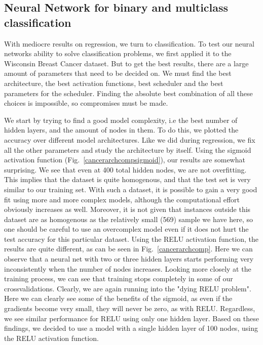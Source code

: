 \documentclass[onecolumn,10pt,cleanfoot]{asme2ej}
\begin{document}
\subsection{Neural Network for binary and multiclass classification}

With mediocre results on regression, we turn to classification. To test our neural networks ability to solve classification problems, we first applied it to the Wisconsin Breast Cancer dataset. But to get the best results, there are a large amount of parameters that need to be decided on. We must find the best architecture, the best activation functions, best scheduler and the best parameters for the scheduler. Finding the absolute best combination of all these choices is impossible, so compromises must be made.

We start by trying to find a good model complexity, i.e the best number of hidden layers, and the amount of nodes in them. To do this, we plotted the accuracy over different model architectures. Like we did during regression, we fix all the other parameters and study the architecture by itself. Using the sigmoid activation function (Fig.~\ref{cancerarchcompsigmoid}), our results are somewhat surprising. We see that even at 400 total hidden nodes, we are not overfitting. This implies that the dataset is quite homogenous, and that the test set is very similar to our training set. With such a dataset, it is possible to gain a very good fit using more and more complex models, although the computational effort obviously increases as well. Moreover, it is not given that instances outside this dataset are as homogenous as the relatively small (569) sample we have here, so one should be careful to use an overcomplex model even if it does not hurt the test accuracy for this particular dataset. Using the RELU activation function, the results are quite different, as can be seen in Fig.~\ref{cancerarchcomp}. Here we can observe that a neural net with two or three hidden layers starts performing very inconsistently when the number of nodes increases. Looking more closely at the training process, we can see that training stops completely in some of our crossvalidations. Clearly, we are again running into the "dying RELU problem". Here we can clearly see some of the benefits of the sigmoid, as even if the gradients become very small, they will never be zero, as with RELU. Regardless, we see similar performance for RELU using only one hidden layer. Based on these findings, we decided to use a model with a single hidden layer of 100 nodes, using the RELU activation function.
\end{document}
